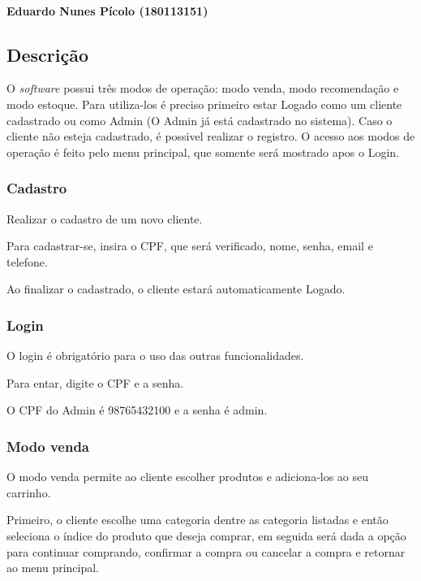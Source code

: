 \paragraph*{Eduardo Nunes Pícolo (180113151)}

\subsection*{Descrição}

O {\itshape software} possui três modos de operação\+: modo venda, modo recomendação e modo estoque. Para utiliza-\/los é preciso primeiro estar Logado como um cliente cadastrado ou como Admin (O Admin já está cadastrado no sistema). Caso o cliente não esteja cadastrado, é possivel realizar o registro. O acesso aos modos de operação é feito pelo menu principal, que somente será mostrado apos o Login.

\subsubsection*{Cadastro}

Realizar o cadastro de um novo cliente.

Para cadastrar-\/se, insira o C\+PF, que será verificado, nome, senha, email e telefone.

Ao finalizar o cadastrado, o cliente estará automaticamente Logado.

\subsubsection*{Login}

O login é obrigatório para o uso das outras funcionalidades.

Para entar, digite o C\+PF e a senha.

O C\+PF do Admin é \textquotesingle{}98765432100\textquotesingle{} e a senha é \textquotesingle{}admin\textquotesingle{}.

\subsubsection*{Modo venda}

O modo venda permite ao cliente escolher produtos e adiciona-\/los ao seu carrinho.

Primeiro, o cliente escolhe uma categoria dentre as categoria listadas e então seleciona o índice do produto que deseja comprar, em seguida será dada a opção para continuar comprando, confirmar a compra ou cancelar a compra e retornar ao menu principal.


